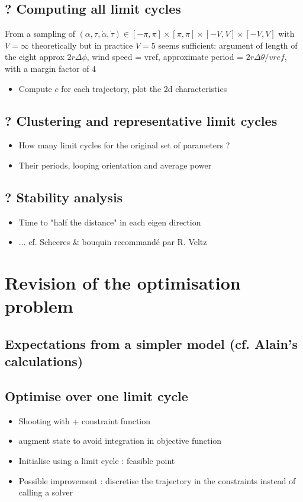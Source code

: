 \subsection{? Computing all limit cycles}
From a sampling of $(\alpha, \tau, \dot \alpha, \dot \tau) \in [-\pi, \pi] \times [\pi, \pi] \times [-V, V] \times [-V, V]$  
\noindent with $V = \infty$ theoretically but in practice $V = 5$ seems sufficient: argument of length of the eight approx $2 r \Delta\phi$, wind speed = vref, approximate period = $2 r \Delta\theta / vref$, with a margin factor of 4  

\begin{itemize}
 \item Compute $c$ for each trajectory, plot the 2d characteristics
\end{itemize}

\subsection{? Clustering and representative limit cycles}
\begin{itemize}
 \item How many limit cycles for the original set of parameters ?
 \item Their periods, looping orientation and average power
\end{itemize}

\subsection{? Stability analysis}
\begin{itemize}
 \item Time to "half the distance" in each eigen direction
 \item ... cf. Scheeres \& bouquin recommandé par R. Veltz
\end{itemize}

\section{Revision of the optimisation problem}

\subsection{Expectations from a simpler model (cf. Alain's calculations)}

\subsection{Optimise over one limit cycle}
\begin{itemize}
 \item Shooting with + constraint function
 \item augment state to avoid integration in objective function
 \item Initialise using a limit cycle : feasible point
 \item Possible improvement : discretise the trajectory in the constraints instead of calling a solver
\end{itemize}

